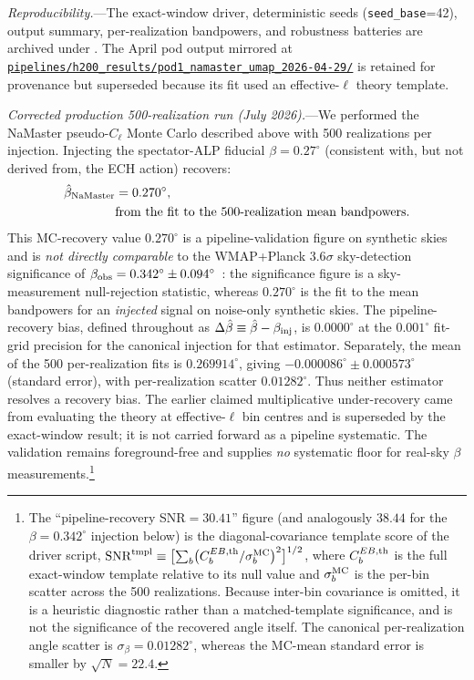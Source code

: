 \documentclass[aps,prd,twocolumn,superscriptaddress,showpacs,preprintnumbers,nofootinbib,longbibliography,floatfix]{revtex4-2}
\begin{document}
\emph{Reproducibility.}---The exact-window driver, deterministic seeds
(\texttt{seed\_base}=42), output summary, per-realization bandpowers, and
robustness batteries are archived under
.
The April pod output mirrored at
\href{https://github.com/Hubify-Projects/bigbounce/tree/main/pipelines/h200_results/pod1_namaster_umap_2026-04-29}{\nolinkurl{pipelines/h200_results/pod1_namaster_umap_2026-04-29/}}
is retained for provenance but superseded because its fit used an
effective-$\ell$ theory template.

\textit{Corrected production 500-realization run (July 2026).}---We
performed the NaMaster pseudo-$C_\ell$ Monte Carlo described above with
500 realizations per injection. Injecting the spectator-ALP fiducial $\beta=0.27^\circ$
(consistent with, but not derived from, the ECH action) recovers:
\begin{equation}
  \begin{aligned}
  \hat\beta_{\rm NaMaster} &= 0.270^\circ,\\
  &\text{from the fit to the 500-realization mean bandpowers}.
  \end{aligned}
  \label{eq:beta_namaster}
\end{equation}
This MC-recovery value $0.270^\circ$ is a pipeline-validation figure on
synthetic skies and is \emph{not directly comparable} to the
WMAP+Planck $3.6\sigma$ sky-detection significance of
$\beta_{\rm obs}=0.342^\circ\pm 0.094^\circ$~\cite{Eskilt2022}: the
significance figure is a sky-measurement null-rejection statistic,
whereas $0.270^\circ$ is the fit to the mean bandpowers for an
\emph{injected} signal on noise-only synthetic skies.
The pipeline-recovery bias, defined throughout as
$\Delta\hat\beta \equiv \hat\beta - \beta_{\rm inj}$, is
$0.0000^\circ$ at the $0.001^\circ$ fit-grid precision for the canonical
injection for that estimator. Separately, the mean of the 500
per-realization fits is $0.269914^\circ$, giving
$-0.000086^\circ\pm0.000573^\circ$ (standard error), with
per-realization scatter $0.01282^\circ$. Thus neither estimator resolves a
recovery bias.
The earlier claimed multiplicative under-recovery came from evaluating the theory at
effective-$\ell$ bin centres and is superseded by the exact-window result;
it is not carried forward as a pipeline systematic.  The validation remains
foreground-free and supplies \emph{no} systematic floor for real-sky
$\beta$ measurements.\footnote{\label{fn:snr_definition}The
``pipeline-recovery SNR$=30.41$'' figure (and analogously $38.44$ for the
$\beta=0.342^\circ$ injection below) is the diagonal-covariance template score of the
driver script,
$\mathrm{SNR}^{\rm tmpl}\equiv\bigl[\sum_b
\bigl(C_b^{EB,\rm th}/\sigma_b^{\rm MC}\bigr)^2\bigr]^{1/2}$, where
$C_b^{EB,\rm th}$ is the full exact-window template relative to its null
value and $\sigma_b^{\rm MC}$ is the per-bin scatter across the 500
realizations. Because inter-bin covariance is omitted, it is a heuristic
diagnostic rather than a matched-template significance, and is not the
significance of the recovered angle itself. The canonical per-realization angle scatter is
$\sigma_\beta=0.01282^\circ$, whereas the MC-mean standard error is smaller
by $\sqrt{N}=22.4$.}
\end{document}
